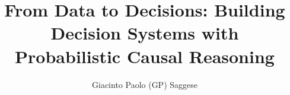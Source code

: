 \documentclass[graybox,envcountchap,sectrefs]{SNmono}
\begin{document}
\author{Giacinto Paolo (GP) Saggese}
\title{From Data to Decisions: Building Decision Systems with Probabilistic Causal Reasoning}
\maketitle

\frontmatter%

%
%
%
%
%

\tableofcontents

%

\mainmatter%
%

%

%
%

\backmatter%
%
%

\end{document}
